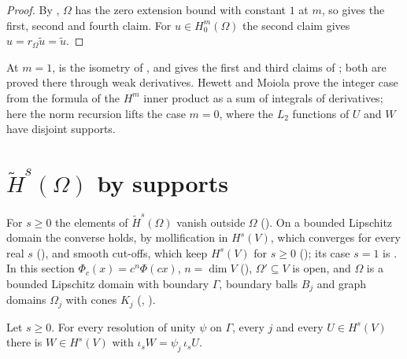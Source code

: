 \begin{proof}
\leanok
By , $\Omega$ has the zero extension bound with constant
$1$ at $m$, so  gives the first, second and fourth claim. For
$u \in H^m_0(\Omega)$ the second claim gives $u = r_\Omega \tilde u = \tilde u$.
\end{proof}

At $m = 1$,  is the isometry of
, and  gives the
first and third claims of ; both are proved there
through weak derivatives. Hewett and Moiola
prove the integer case from the formula of the $H^m$ inner product as a sum of integrals of
derivatives; here the norm recursion lifts the case $m = 0$, where the $L_2$ functions of $U$ and
$W$ have disjoint supports.

\section{\texorpdfstring{$\tilde H^s(\Omega)$}{Tilde H\^{}s(Omega)} by supports}
\label{sec:tilde-space-support}

For $s \geq 0$ the elements of $\tilde H^s(\Omega)$ vanish outside $\Omega$
(). On a bounded Lipschitz domain the converse
holds, by mollification in $H^s(V)$, which converges for every real $s$
(), and smooth cut-offs, which keep $H^s(V)$ for $s \geq 0$
(); its case $s = 1$ is . In this
section $\Phi_c(x) = c^n \Phi(c x)$, $n = \dim V$ (), $\Omega' \subseteq V$ is
open, and $\Omega$ is a bounded Lipschitz domain with boundary $\Gamma$, boundary balls $B_j$ and
graph domains $\Omega_j$ with cones $K_j$ (, ).

\begin{lemma}
\label{lem:sobolev-localize}
\leanok
{}
Let $s \geq 0$. For every resolution of unity $\psi$ on $\Gamma$, every $j$ and every
$U \in H^s(V)$ there is $W \in H^s(V)$ with $\iota_s W = \psi_j \, \iota_s U$.
\end{lemma}

